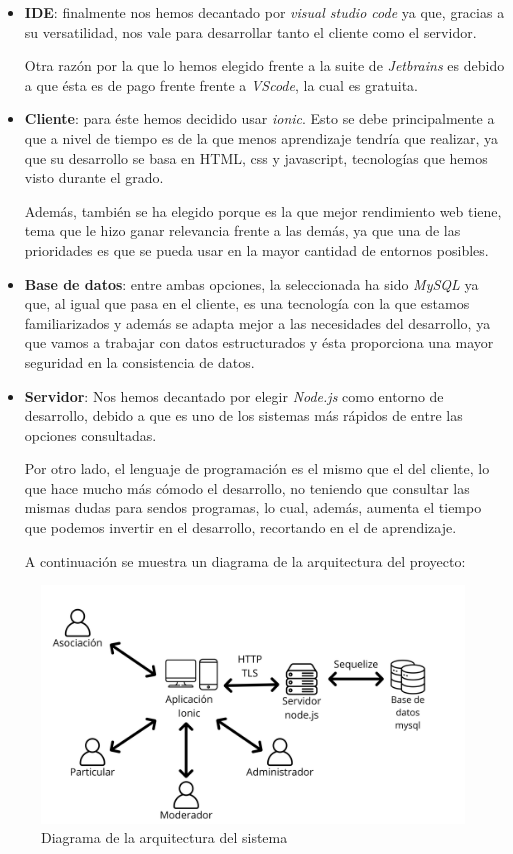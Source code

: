\begin{itemize}
	\item \textbf{IDE}: finalmente nos hemos decantado por \textit{visual studio code} ya que, gracias a su versatilidad, nos vale para desarrollar tanto el cliente como el servidor. 
	
	Otra razón por la que lo hemos elegido frente a la suite de \textit{Jetbrains} es debido a que ésta es de pago frente frente a \textit{VScode}, la cual es gratuita.
	
	\item \textbf{Cliente}: para éste hemos decidido usar \textit{ionic}. Esto se debe principalmente a que a nivel de tiempo es de la que menos aprendizaje tendría que realizar, ya que su desarrollo se basa en HTML, css y javascript, tecnologías que hemos visto durante el grado.
	
	Además, también se ha elegido porque es la que mejor rendimiento web tiene, tema que le hizo ganar relevancia frente a las demás, ya que una de las prioridades es que se pueda usar en la mayor cantidad de entornos posibles.
	
	\item \textbf{Base de datos}: entre ambas opciones, la seleccionada ha sido \textit{MySQL} ya que, al igual que pasa en el cliente, es una tecnología con la que estamos familiarizados y además se adapta mejor a las necesidades del desarrollo, ya que vamos a trabajar con datos estructurados y ésta proporciona una mayor seguridad en la consistencia de datos.
	
	\item \textbf{Servidor}: Nos hemos decantado por elegir \textit{Node.js} como entorno de desarrollo, debido a que es uno de los sistemas más rápidos de entre las opciones consultadas.
	
	Por otro lado, el lenguaje de programación es el mismo que el del cliente, lo que hace mucho más cómodo el desarrollo, no teniendo que consultar las mismas dudas para sendos programas, lo cual, además, aumenta el tiempo que podemos invertir en el desarrollo, recortando en el de aprendizaje.
	
	A continuación se muestra un diagrama de la arquitectura del proyecto: 
\end{itemize}
\begin{figure}[H]
	\centering
	\includegraphics[width=1\linewidth]{"Sprint 0/diagramaArquitectura"}
	\caption{Diagrama de la arquitectura del sistema}
	\label{fig:diagrama_arquitectura}
\end{figure}

